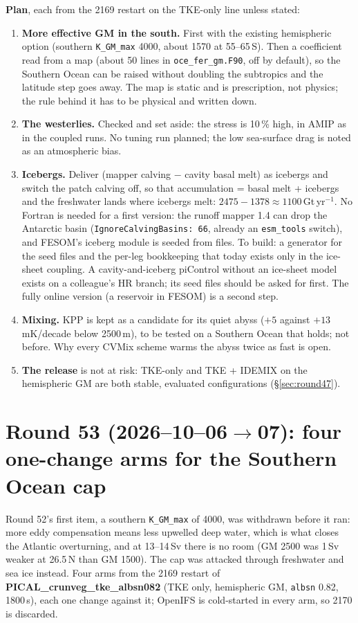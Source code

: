\documentclass[10pt]{article}
\begin{document}
\textbf{Plan}, each from the 2169 restart on the TKE-only line unless stated:
\begin{enumerate}\itemsep2pt
\item \textbf{More effective GM in the south.} First with the existing hemispheric option (southern
\texttt{K\_GM\_max} 4000, about 1570 at 55--65\,S). Then a coefficient read from a map (about 50
lines in \texttt{oce\_fer\_gm.F90}, off by default), so the Southern Ocean can be raised without
doubling the subtropics and the latitude step goes away. The map is static and is prescription, not
physics; the rule behind it has to be physical and written down.
\item \textbf{The westerlies.} Checked and set aside: the stress is 10\,\% high, in AMIP as in the
coupled runs. No tuning run planned; the low sea-surface drag is noted as an atmospheric bias.
\item \textbf{Icebergs.} Deliver (mapper calving $-$ cavity basal melt) as icebergs and switch the
patch calving off, so that accumulation = basal melt + icebergs and the freshwater lands where
icebergs melt: $2475-1378\approx1100$\,Gt\,yr$^{-1}$. No Fortran is needed for a first version: the
runoff mapper 1.4 can drop the Antarctic basin (\texttt{IgnoreCalvingBasins: 66}, already an
\texttt{esm\_tools} switch), and FESOM's iceberg module is seeded from files. To build: a generator
for the seed files and the per-leg bookkeeping that today exists only in the ice-sheet coupling. A
cavity-and-iceberg piControl without an ice-sheet model exists on a colleague's HR branch; its seed
files should be asked for first. The fully online version (a reservoir in FESOM) is a second step.
\item \textbf{Mixing.} KPP is kept as a candidate for its quiet abyss ($+5$ against
$+13$\,mK/decade below 2500\,m), to be tested on a Southern Ocean that holds; not before. Why every
CVMix scheme warms the abyss twice as fast is open.
\item \textbf{The release} is not at risk: TKE-only and TKE + IDEMIX on the hemispheric GM are both
stable, evaluated configurations (\S\ref{sec:round47}).
\end{enumerate}

\section{Round 53 (2026--10--06$\to$07): four one-change arms for the Southern Ocean cap}\label{sec:round53}

Round 52's first item, a southern \texttt{K\_GM\_max} of 4000, was withdrawn before it ran: more eddy
compensation means less upwelled deep water, which is what closes the Atlantic overturning, and at
13--14\,Sv there is no room (GM 2500 was 1\,Sv weaker at 26.5\,N than GM 1500). The cap was attacked
through freshwater and sea ice instead. Four arms from the 2169 restart of
\textbf{PICAL\_crunveg\_tke\_albsn082} (TKE only, hemispheric GM, \texttt{albsn} 0.82, 1800\,s), each
one change against it; OpenIFS is cold-started in every arm, so 2170 is discarded.
\end{document}
